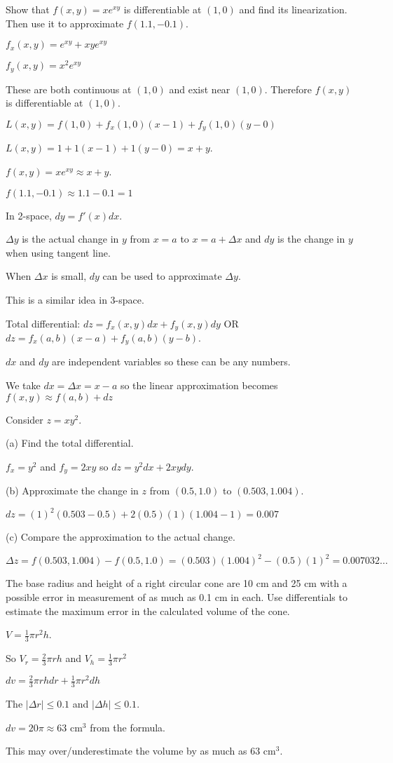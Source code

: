 \documentclass[../calc3.tex]{subfiles}
\begin{document}
\begin{example}
    Show that $f(x,y)=xe^{xy}$ is differentiable at $(1,0)$ and find its linearization. Then use it to approximate $f(1.1,-0.1)$.

    $f_x(x,y)=e^{xy}+xye^{xy}$

    $f_y(x,y)=x^2e^{xy}$

    These are both continuous at $(1,0)$ and exist near $(1,0)$. Therefore $f(x,y)$ is differentiable at $(1,0)$.

    $L(x,y)=f(1,0)+f_x(1,0)(x-1)+f_y(1,0)(y-0)$

    $L(x,y)=1+1(x-1)+1(y-0)=x+y$.

    $f(x,y)=xe^{xy}\approx x+y$.

    $f(1.1,-0.1)\approx 1.1-0.1 = 1$
\end{example}

In 2-space, $dy=f'(x)dx$.

$\Delta y$ is the actual change in $y$ from $x=a$ to $x=a+\Delta x$ and $dy$ is the change in $y$ when using tangent line.

When $\Delta x$ is small, $dy$ can be used to approximate $\Delta y$.

This is a similar idea in $3$-space.

Total differential: $dz=f_x(x,y)dx+f_y(x,y)dy$ OR $dz=f_x(a,b)(x-a)+f_y(a,b)(y-b)$.

$dx$ and $dy$ are independent variables so these can be any numbers.

We take $dx=\Delta x=x-a$ so the linear approximation becomes $f(x,y)\approx f(a,b)+dz$

\begin{example}
    Consider $z=xy^2$. 

    (a) Find the total differential.

    $f_x=y^2$ and $f_y=2xy$ so $dz=y^2dx+2xydy$.

    (b) Approximate the change in $z$ from $(0.5,1.0)$ to $(0.503, 1.004)$.

    $dz=(1)^2(0.503-0.5)+2(0.5)(1)(1.004-1)=0.007$

    (c) Compare the approximation to the actual change.

    $\Delta z = f(0.503,1.004)-f(0.5,1.0)=(0.503)(1.004)^2-(0.5)(1)^2=0.007032\dots$
\end{example}

\begin{example}
    The base radius and height of a right circular cone are 10 cm and 25 cm with a possible error in measurement of as much as 0.1 cm in each. Use differentials to estimate the maximum error in the calculated volume of the cone.

    $V=\frac{1}{3}\pi r^2 h$.

    So $V_r=\frac{2}{3}\pi rh$ and $V_h = \frac{1}{3}\pi r^2$

    $dv=\frac{2}{3}\pi rh dr + \frac{1}{3}\pi r^2 dh$

    The $|\Delta r|\leq 0.1$ and $|\Delta h|\leq 0.1$.

    $dv=20\pi \approx 63$ cm$^3$ from the formula.

    This may over/underestimate the volume by as much as $63$ cm$^3$.
\end{example}
\end{document}
